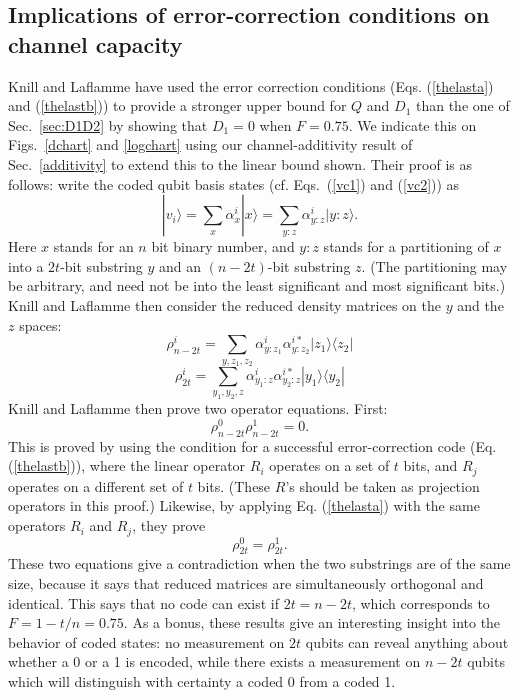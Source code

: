 \subsection{Implications of error-correction conditions on 
channel capacity}
\label{newupperbound}
Knill and Laflamme\cite{lafknill} have used the error correction 
conditions (Eqs. (\ref{thelasta}) and (\ref{thelastb})) to provide 
a stronger upper bound for $Q$ and $D_1$ than the one of Sec.~\ref{sec:D1D2}
by showing that $D_1=0$ when $F=0.75$. 
We indicate this on Figs.~\ref{dchart} and \ref{logchart} using our 
channel-additivity result of Sec.~\ref{additivity} to extend this to the linear
bound shown.
Their proof is as follows: write the coded qubit basis states (cf. 
Eqs.~(\ref{vc1}) and (\ref{vc2})) as 
\begin{equation}
|v_i\rangle=\sum_x\alpha^i_x|x\rangle=\sum_{y:z}\alpha^i_{y:z}|y:z\rangle.
\end{equation}
Here $x$ stands for an $n$ bit binary number, and $y:z$ stands for a partitioning
of $x$ into a $2t$-bit substring $y$ and an $(n-2t)$-bit substring $z$.  (The 
partitioning may be arbitrary, and need not be into the least significant and
most significant bits.)  Knill and Laflamme then consider the reduced
density matrices on the $y$ and the $z$ spaces:
\begin{equation}
\rho^i_{n-2t}=\sum_{y,z_1,z_2}\alpha^i_{y:z_1}\alpha^{i*}_{y:z_2}|z_1\rangle
\langle z_2|
\end{equation}
\begin{equation}
\rho^i_{2t}=\sum_{y_1,y_2,z}\alpha^i_{y_1:z}\alpha^{i*}_{y_2:z}|y_1\rangle
\langle y_2|
\end{equation}
Knill and Laflamme then prove two operator equations.  First:
\begin{equation}
\rho^0_{n-2t}\rho^1_{n-2t}=0.
\end{equation}
This is proved by using the condition for a successful error-correction code
(Eq. (\ref{thelastb})),
where the linear operator $R_i$ operates on a set of $t$ bits, and $R_j$
operates on a different set of $t$ bits.  (These $R$'s should be taken
as projection operators in this proof.)  Likewise, by applying Eq. 
(\ref{thelasta}) with the same operators $R_i$ and $R_j$,
they prove
\begin{equation}
\rho^0_{2t}=\rho^1_{2t}.
\end{equation}
These two equations give a contradiction when the two substrings are of the
same size, because it says that reduced matrices are simultaneously orthogonal
and identical.  This says that no code can exist if $2t=n-2t$, which 
corresponds to $F=1-t/n=0.75$.  As a bonus, these results give an interesting 
insight into the behavior of coded states: no measurement on $2t$ qubits can 
reveal anything about whether a 0 or a 1 is encoded, while there exists a 
measurement on $n-2t$
qubits which will distinguish with certainty a coded 0 from a coded 1.


